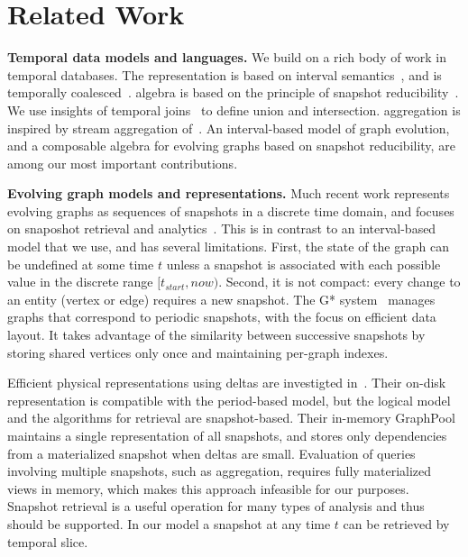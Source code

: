 \section{Related Work}
\label{sec:related}

{\bf Temporal data models and languages.} We build on a rich body of
work in temporal databases.  The \tg representation is based on
interval semantics~\cite{DBLP:reference/db/JensenS09k}, and is
temporally coalesced~\cite{DBLP:conf/vldb/BohlenSS96}.  \tg algebra is
based on the principle of snapshot
reducibility~\cite{DBLP:reference/db/Bohlen092}.  We use insights of
temporal joins~\cite{Gao2005} to define \tg union and intersection.
aggregation is inspired by stream aggregation of~\cite{Li2005}.  An
interval-based model of graph evolution, and a composable algebra for
evolving graphs based on snapshot reducibility, are among our most
important contributions.

{\bf Evolving graph models and representations.} Much recent work represents evolving graphs as sequences
of snapshots in a discrete time domain, and focuses on snaposhot
retrieval and
analytics~\cite{Khurana2013,DBLP:journals/tos/MiaoHLWYZPCC15,Ren2011}.
This is in contrast to an interval-based model that we use, and has
several limitations.  First, the state of the graph can be undefined
at some time $t$ unless a snapshot is associated with each possible
value in the discrete range $[t_{start}, now)$.  Second, it is not
  compact: every change to an entity (vertex or edge) requires a new
  snapshot.
%
The G* system~\cite{Labouseur2015} manages graphs that correspond to
periodic snapshots, with the focus on efficient data layout.  It takes
advantage of the similarity between successive snapshots by storing
shared vertices only once and maintaining per-graph indexes. 

Efficient physical representations using deltas are investigted
in~\cite{Khurana2013}.  Their on-disk representation is compatible
with the period-based model, but the logical model and the algorithms
for retrieval are snapshot-based.  Their in-memory GraphPool maintains
a single representation of all snapshots, and stores only dependencies
from a materialized snapshot when deltas are small.  Evaluation of
queries involving multiple snapshots, such as aggregation, requires
fully materialized views in memory, which makes this approach
infeasible for our purposes.  Snapshot retrieval is a useful operation
for many types of analysis and thus should be supported.  In our model
a snapshot at any time $t$ can be retrieved by temporal slice.

